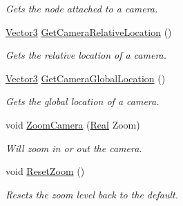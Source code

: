 \begin{DoxyCompactItemize}
\begin{DoxyCompactList}\small\item\em Gets the node attached to a camera. \item\end{DoxyCompactList}\item 
\hyperlink{classphys_1_1Vector3}{Vector3} \hyperlink{classphys_1_1Camera_a771fc7005191c3f83ac1fedb09699943}{GetCameraRelativeLocation} ()
\begin{DoxyCompactList}\small\item\em Gets the relative location of a camera. \item\end{DoxyCompactList}\item 
\hyperlink{classphys_1_1Vector3}{Vector3} \hyperlink{classphys_1_1Camera_a53b61b6c163270ffb4f46eb66a973b10}{GetCameraGlobalLocation} ()
\begin{DoxyCompactList}\small\item\em Gets the global location of a camera. \item\end{DoxyCompactList}\item 
void \hyperlink{classphys_1_1Camera_a1cb593d12be4e6e1e51cb8f74ce2d97c}{ZoomCamera} (\hyperlink{namespacephys_af7eb897198d265b8e868f45240230d5f}{Real} Zoom)
\begin{DoxyCompactList}\small\item\em Will zoom in or out the camera. \item\end{DoxyCompactList}\item 
void \hyperlink{classphys_1_1Camera_a181465e6add36c07a63fdd26aee7c69a}{ResetZoom} ()
\begin{DoxyCompactList}\small\item\em Resets the zoom level back to the default. \item\end{DoxyCompactList}\end{DoxyCompactItemize}
